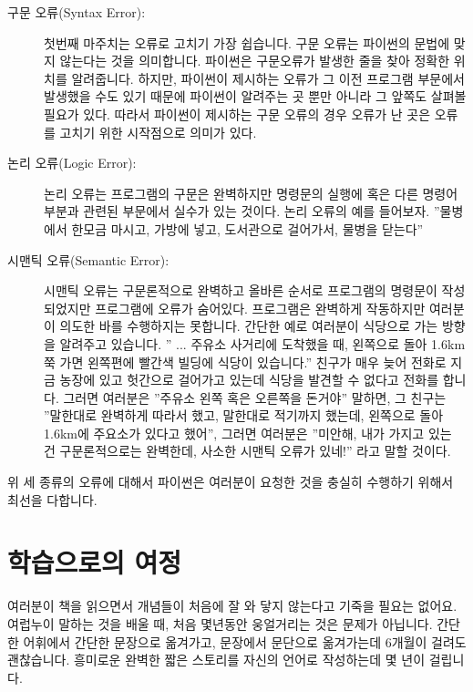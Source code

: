 \begin{description}

\item[구문 오류(Syntax Error):]첫번째 마주치는 오류로 고치기 가장 쉽습니다. 구문 오류는 파이썬의 문법에 맞지 않는다는 것을 의미합니다. 파이썬은 구문오류가 발생한 줄을 찾아 정확한 위치를 알려줍니다. 하지만, 파이썬이 제시하는 오류가 그 이전 프로그램 부문에서 발생했을 수도 있기 때문에 파이썬이 알려주는 곳 뿐만 아니라 그 앞쪽도 살펴볼 필요가 있다. 따라서 파이썬이 제시하는 구문 오류의 경우 오류가 난 곳은 오류를 고치기 위한 시작점으로 의미가 있다.

\item[논리 오류(Logic Error):] 논리 오류는 프로그램의 구문은 완벽하지만 명령문의 실행에 혹은 다른 명령어부분과 관련된 부문에서 실수가 있는 것이다. 논리 오류의 예를 들어보자. ''물병에서 한모금 마시고, 가방에 넣고, 도서관으로 걸어가서, 물병을 닫는다''

\item[시맨틱 오류(Semantic Error):] 시맨틱 오류는 구문론적으로 완벽하고 올바른 순서로 프로그램의 명령문이 작성되었지만 프로그램에 오류가 숨어있다. 프로그램은 완벽하게 작동하지만 여러분이 의도한 바를 수행하지는 못합니다. 간단한 예로 여러분이 식당으로 가는 방향을 알려주고 있습니다. '' ... 주유소 사거리에 도착했을 때, 왼쪽으로 돌아 1.6km 쭉 가면 왼쪽편에 빨간색 빌딩에 식당이 있습니다.'' 친구가 매우 늦어 전화로 지금 농장에 있고 헛간으로 걸어가고 있는데 식당을 발견할 수 없다고 전화를 합니다. 그러면 여러분은 ''주유소 왼쪽 혹은 오른쪽을 돈거야'' 말하면, 그 친구는 ''말한대로 완벽하게 따라서 했고, 말한대로 적기까지 했는데, 왼쪽으로 돌아 1.6km에 주요소가 있다고 했어'', 그러면 여러분은 ''미안해, 내가 가지고 있는 건 구문론적으로는 완벽한데, 사소한 시맨틱 오류가 있네!'' 라고 말할 것이다.

\end{description}

위 세 종류의 오류에 대해서 파이썬은 여러분이 요청한 것을 충실히 수행하기 위해서 최선을 다합니다.

\section{학습으로의 여정}

여러분이 책을 읽으면서 개념들이 처음에 잘 와 닿지 않는다고 기죽을 필요는 없어요. 여럽누이 말하는 것을 배울 때, 처음 몇년동안 웅얼거리는 것은 문제가 아닙니다. 간단한 어휘에서 간단한 문장으로 옮겨가고, 문장에서 문단으로 옮겨가는데 6개월이 걸려도 괜찮습니다. 흥미로운 완벽한 짧은 스토리를 자신의 언어로 작성하는데 몇 년이 걸립니다.

